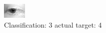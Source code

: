 \begin{figure}[h!]
\begin{center}
\includegraphics[width=0.60\columnwidth]{figures/ID2623_class_3_target_4.png}
\end{center}
\caption{ Classification: 3 actual target: 4}
\label{fig:ID2623_class_3_target_4}
\end{figure}
